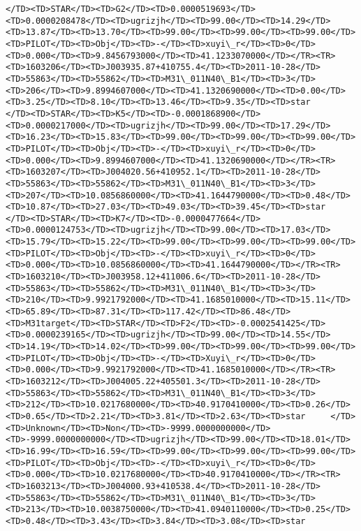 \documentclass[11pt]{article}
\begin{document}
\begin{Verbatim}[commandchars=\\\{\}]
</TD><TD>STAR</TD><TD>G2</TD><TD>0.0000519693</TD><TD>0.0000208478</TD><TD>ugrizjh</TD><TD>99.00</TD><TD>14.29</TD><TD>13.87</TD><TD>13.70</TD><TD>99.00</TD><TD>99.00</TD><TD>99.00</TD><TD>PILOT</TD><TD>Obj</TD><TD>-</TD><TD>xuyi\_r</TD><TD>0</TD><TD>0.000</TD><TD>9.8456793000</TD><TD>41.1233070000</TD></TR><TR><TD>1603206</TD><TD>J003935.87+410755.4</TD><TD>2011-10-28</TD><TD>55863</TD><TD>55862</TD><TD>M31\_011N40\_B1</TD><TD>3</TD><TD>206</TD><TD>9.8994607000</TD><TD>41.1320690000</TD><TD>0.00</TD><TD>3.25</TD><TD>8.10</TD><TD>13.46</TD><TD>9.35</TD><TD>star     </TD><TD>STAR</TD><TD>K5</TD><TD>-0.0001868900</TD><TD>0.0000217000</TD><TD>ugrizjh</TD><TD>99.00</TD><TD>17.29</TD><TD>16.23</TD><TD>15.83</TD><TD>99.00</TD><TD>99.00</TD><TD>99.00</TD><TD>PILOT</TD><TD>Obj</TD><TD>-</TD><TD>xuyi\_r</TD><TD>0</TD><TD>0.000</TD><TD>9.8994607000</TD><TD>41.1320690000</TD></TR><TR><TD>1603207</TD><TD>J004020.56+410952.1</TD><TD>2011-10-28</TD><TD>55863</TD><TD>55862</TD><TD>M31\_011N40\_B1</TD><TD>3</TD><TD>207</TD><TD>10.0856860000</TD><TD>41.1644790000</TD><TD>0.48</TD><TD>10.87</TD><TD>27.03</TD><TD>49.03</TD><TD>39.45</TD><TD>star     </TD><TD>STAR</TD><TD>K7</TD><TD>-0.0000477664</TD><TD>0.0000124753</TD><TD>ugrizjh</TD><TD>99.00</TD><TD>17.03</TD><TD>15.79</TD><TD>15.22</TD><TD>99.00</TD><TD>99.00</TD><TD>99.00</TD><TD>PILOT</TD><TD>Obj</TD><TD>-</TD><TD>xuyi\_r</TD><TD>0</TD><TD>0.000</TD><TD>10.0856860000</TD><TD>41.1644790000</TD></TR><TR><TD>1603210</TD><TD>J003958.12+411006.6</TD><TD>2011-10-28</TD><TD>55863</TD><TD>55862</TD><TD>M31\_011N40\_B1</TD><TD>3</TD><TD>210</TD><TD>9.9921792000</TD><TD>41.1685010000</TD><TD>15.11</TD><TD>65.89</TD><TD>87.31</TD><TD>117.42</TD><TD>86.48</TD><TD>M31target</TD><TD>STAR</TD><TD>F2</TD><TD>-0.0002541425</TD><TD>0.0000239165</TD><TD>ugrizjh</TD><TD>99.00</TD><TD>14.55</TD><TD>14.19</TD><TD>14.02</TD><TD>99.00</TD><TD>99.00</TD><TD>99.00</TD><TD>PILOT</TD><TD>Obj</TD><TD>-</TD><TD>Xuyi\_r</TD><TD>0</TD><TD>0.000</TD><TD>9.9921792000</TD><TD>41.1685010000</TD></TR><TR><TD>1603212</TD><TD>J004005.22+405501.3</TD><TD>2011-10-28</TD><TD>55863</TD><TD>55862</TD><TD>M31\_011N40\_B1</TD><TD>3</TD><TD>212</TD><TD>10.0217680000</TD><TD>40.9170410000</TD><TD>0.26</TD><TD>0.65</TD><TD>2.21</TD><TD>3.81</TD><TD>2.63</TD><TD>star     </TD><TD>Unknown</TD><TD>Non</TD><TD>-9999.0000000000</TD><TD>-9999.0000000000</TD><TD>ugrizjh</TD><TD>99.00</TD><TD>18.01</TD><TD>16.99</TD><TD>16.59</TD><TD>99.00</TD><TD>99.00</TD><TD>99.00</TD><TD>PILOT</TD><TD>Obj</TD><TD>-</TD><TD>xuyi\_r</TD><TD>0</TD><TD>0.000</TD><TD>10.0217680000</TD><TD>40.9170410000</TD></TR><TR><TD>1603213</TD><TD>J004000.93+410538.4</TD><TD>2011-10-28</TD><TD>55863</TD><TD>55862</TD><TD>M31\_011N40\_B1</TD><TD>3</TD><TD>213</TD><TD>10.0038750000</TD><TD>41.0940110000</TD><TD>0.25</TD><TD>0.48</TD><TD>3.43</TD><TD>3.84</TD><TD>3.08</TD><TD>star     
\end{Verbatim}
\end{document}
